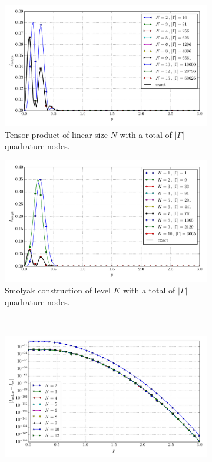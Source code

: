 \documentclass[a4paper,10pt]{article}
\begin{document}
\begin{figure}[ht!]
  \begin{subfigure}[t]{0.5\linewidth}
    \includegraphics[width=\linewidth]{./plots/tp_sg_4d_conv_p_(0,2,1,1)_(1,2,1,0)_val_nsd_tp.pdf}
    \caption{Tensor product of linear size $N$ with a total of $|\Gamma|$ quadrature nodes.}
    \label{fig:tp_sg_4d_conv_p_0211_1210_val_nsd_tp}
  \end{subfigure}
  \begin{subfigure}[t]{0.5\linewidth}
    \includegraphics[width=\linewidth]{./plots/tp_sg_4d_conv_p_(0,2,1,1)_(1,2,1,0)_val_nsd_gk.pdf}
    \caption{Smolyak construction of level $K$ with a total of $|\Gamma|$ quadrature nodes.}
    \label{fig:tp_sg_4d_conv_p_0211_1210_val_nsd_gk}
  \end{subfigure} \\
  \begin{subfigure}[t]{0.5\linewidth}
    \includegraphics[width=\linewidth]{./plots/tp_sg_4d_conv_p_(0,2,1,1)_(1,2,1,0)_err_nsd_tp.pdf}

\end{subfigure}
\end{figure}
\end{document}
